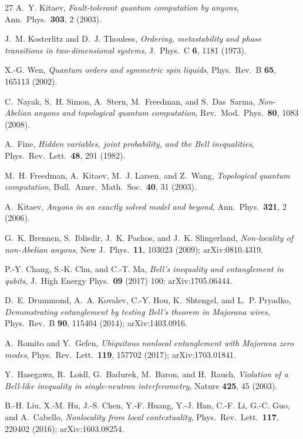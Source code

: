 \documentclass[aps,pra,twocolumn,superscriptaddress,showpacs,floatfix]{revtex4-2}
\begin{document}
\begin{thebibliography}{27}
A.~Y. Kitaev,
\emph{Fault-tolerant quantum computation by anyons},
Ann.\ Phys.\ \textbf{303}, 2 (2003).

J.~M. Kosterlitz and D.~J. Thouless,
\emph{Ordering, metastability and phase transitions in two-dimensional systems},
J.\ Phys.\ C \textbf{6}, 1181 (1973).

X.-G. Wen,
\emph{Quantum orders and symmetric spin liquids},
Phys.\ Rev.\ B \textbf{65}, 165113 (2002).

C.~Nayak, S.~H. Simon, A.~Stern, M.~Freedman, and S.~Das~Sarma,
\emph{Non-Abelian anyons and topological quantum computation},
Rev.\ Mod.\ Phys.\ \textbf{80}, 1083 (2008).

A.~Fine,
\emph{Hidden variables, joint probability, and the Bell inequalities},
Phys.\ Rev.\ Lett.\ \textbf{48}, 291 (1982).

M.~H. Freedman, A.~Kitaev, M.~J. Larsen, and Z.~Wang,
\emph{Topological quantum computation},
Bull.\ Amer.\ Math.\ Soc.\ \textbf{40}, 31 (2003).

A.~Kitaev,
\emph{Anyons in an exactly solved model and beyond},
Ann.\ Phys.\ \textbf{321}, 2 (2006).


G.~K. Brennen, S.~Iblisdir, J.~K. Pachos, and J.~K. Slingerland,
\emph{Non-locality of non-Abelian anyons},
New J.\ Phys.\ \textbf{11}, 103023 (2009);
arXiv:0810.4319.

P.-Y. Chang, S.-K. Chu, and C.-T. Ma,
\emph{Bell's inequality and entanglement in qubits},
J.\ High Energy Phys.\ \textbf{09} (2017) 100;
arXiv:1705.06444.

D.~E. Drummond, A.~A. Kovalev, C.-Y. Hou, K.~Shtengel, and L.~P. Pryadko,
\emph{Demonstrating entanglement by testing Bell's theorem in Majorana wires},
Phys.\ Rev.\ B \textbf{90}, 115404 (2014);
arXiv:1403.0916.

A.~Romito and Y.~Gefen,
\emph{Ubiquitous nonlocal entanglement with Majorana zero modes},
Phys.\ Rev.\ Lett.\ \textbf{119}, 157702 (2017);
arXiv:1703.01841.

Y.~Hasegawa, R.~Loidl, G.~Badurek, M.~Baron, and H.~Rauch,
\emph{Violation of a Bell-like inequality in single-neutron interferometry},
Nature \textbf{425}, 45 (2003).

B.-H. Liu, X.-M. Hu, J.-S. Chen, Y.-F. Huang, Y.-J. Han, C.-F. Li, G.-C. Guo, and A.~Cabello,
\emph{Nonlocality from local contextuality},
Phys.\ Rev.\ Lett.\ \textbf{117}, 220402 (2016);
arXiv:1603.08254.


\end{thebibliography}
\end{document}
